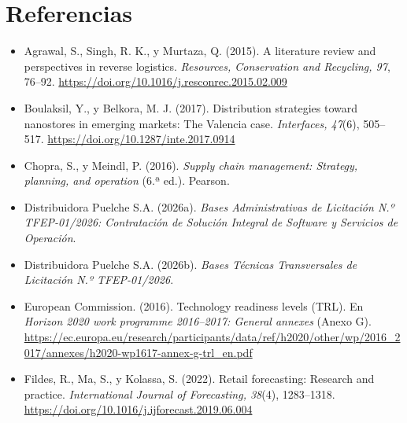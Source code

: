 \documentclass[carta,firma]{lafrox}
\begin{document}
\section{Referencias}
\begin{itemize}[itemsep=1pt]
\item \begin{samepage}
Agrawal, S., Singh, R. K., y Murtaza, Q. (2015). A literature review and perspectives in reverse logistics. \emph{Resources, Conservation and Recycling, 97}, 76–92. \url{https://doi.org/10.1016/j.resconrec.2015.02.009}
\end{samepage}
\item \begin{samepage}
Boulaksil, Y., y Belkora, M. J. (2017). Distribution strategies toward nanostores in emerging markets: The Valencia case. \emph{Interfaces, 47}(6), 505–517. \url{https://doi.org/10.1287/inte.2017.0914}
\end{samepage}
\item \begin{samepage}
Chopra, S., y Meindl, P. (2016). \emph{Supply chain management: Strategy, planning, and operation} (6.ª ed.). Pearson.
\end{samepage}
\item \begin{samepage}
Distribuidora Puelche S.A. (2026a). \emph{Bases Administrativas de Licitación N.º TFEP-01/2026: Contratación de Solución Integral de Software y Servicios de Operación}.
\end{samepage}
\item \begin{samepage}
Distribuidora Puelche S.A. (2026b). \emph{Bases Técnicas Transversales de Licitación N.º TFEP-01/2026}.
\end{samepage}
\item \begin{samepage}
European Commission. (2016). Technology readiness levels (TRL). En \emph{Horizon 2020 work programme 2016–2017: General annexes} (Anexo G). \url{https://ec.europa.eu/research/participants/data/ref/h2020/other/wp/2016_2017/annexes/h2020-wp1617-annex-g-trl_en.pdf}
\end{samepage}
\item \begin{samepage}
Fildes, R., Ma, S., y Kolassa, S. (2022). Retail forecasting: Research and practice. \emph{International Journal of Forecasting, 38}(4), 1283–1318. \url{https://doi.org/10.1016/j.ijforecast.2019.06.004}
\end{samepage}

\end{itemize}
\end{document}
